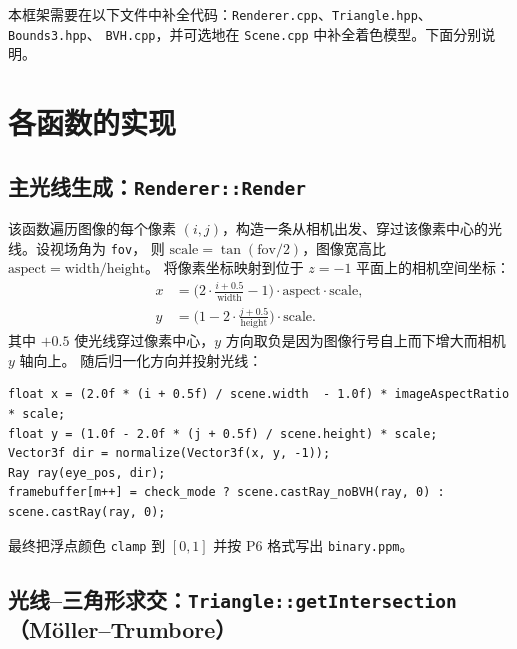 \documentclass[11pt]{ctexart}
\begin{document}
本框架需要在以下文件中补全代码：\texttt{Renderer.cpp}、\texttt{Triangle.hpp}、\texttt{Bounds3.hpp}、
\texttt{BVH.cpp}，并可选地在 \texttt{Scene.cpp} 中补全着色模型。下面分别说明。

\section{各函数的实现}

\subsection{主光线生成：\texttt{Renderer::Render}}

该函数遍历图像的每个像素 $(i,j)$，构造一条从相机出发、穿过该像素中心的光线。设视场角为 \texttt{fov}，
则 $\text{scale}=\tan(\text{fov}/2)$，图像宽高比 $\text{aspect}=\text{width}/\text{height}$。
将像素坐标映射到位于 $z=-1$ 平面上的相机空间坐标：
\begin{align}
x &= \bigl(2\cdot\tfrac{i+0.5}{\text{width}}-1\bigr)\cdot\text{aspect}\cdot\text{scale},\\
y &= \bigl(1-2\cdot\tfrac{j+0.5}{\text{height}}\bigr)\cdot\text{scale}.
\end{align}
其中 $+0.5$ 使光线穿过像素中心，$y$ 方向取负是因为图像行号自上而下增大而相机 $y$ 轴向上。
随后归一化方向并投射光线：

\begin{lstlisting}
float x = (2.0f * (i + 0.5f) / scene.width  - 1.0f) * imageAspectRatio * scale;
float y = (1.0f - 2.0f * (j + 0.5f) / scene.height) * scale;
Vector3f dir = normalize(Vector3f(x, y, -1));
Ray ray(eye_pos, dir);
framebuffer[m++] = check_mode ? scene.castRay_noBVH(ray, 0) : scene.castRay(ray, 0);
\end{lstlisting}

最终把浮点颜色 \texttt{clamp} 到 $[0,1]$ 并按 P6 格式写出 \texttt{binary.ppm}。

\subsection{光线–三角形求交：\texttt{Triangle::getIntersection}（Möller–Trumbore）}
\end{document}
